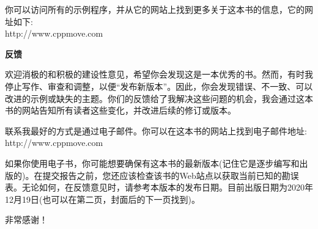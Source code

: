 你可以访问所有的示例程序，并从它的网站上找到更多关于这本书的信息，它的网址如下:\\http://www.cppmove.com\par

\hspace*{\fill} \par %
\textbf{反馈}

欢迎消极的和积极的建设性意见，希望你会发现这是一本优秀的书。然而，有时我停止写作、审查和调整，以便“发布新版本”。因此，你会发现错误、不一致、可以改进的示例或缺失的主题。你们的反馈给了我解决这些问题的机会，我会通过这本书的网站告知所有读者这些变化，并改进后续的修订或版本。\par

联系我最好的方式是通过电子邮件。你可以在这本书的网站上找到电子邮件地址:\\http://www.cppmove.com\par

如果你使用电子书，你可能想要确保有这本书的最新版本(记住它是逐步编写和出版的)。在提交报告之前，您还应该检查该书的Web站点以获取当前已知的勘误表。无论如何，在反馈意见时，请参考本版本的发布日期。目前出版日期为2020年12月19日(也可以在第二页，封面后的下一页找到)。\par

非常感谢！\par

\newpage




















